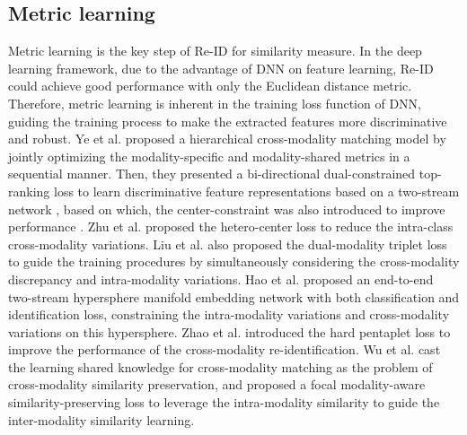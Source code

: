 \documentclass[journal]{IEEEtran}
\begin{document}
\subsection{Metric learning}
Metric learning is the key step of Re-ID for similarity measure. In the deep learning framework, due to the advantage of DNN on feature learning, Re-ID could achieve good performance with only the Euclidean distance metric. Therefore, metric learning is inherent in the training loss function of DNN, guiding the training process to make the extracted features more discriminative and robust.
Ye et al. \cite{ye2018hierarchical} proposed a hierarchical cross-modality matching model by jointly optimizing the modality-specific and modality-shared metrics in a sequential manner. Then, they presented a bi-directional dual-constrained top-ranking loss to learn discriminative feature representations based on a two-stream network \cite{ye2018visible}, based on which, the center-constraint was also introduced to improve performance \cite{tifs19vtreid}.
Zhu et al. \cite{zhu2019hetero} proposed the hetero-center loss to reduce the intra-class cross-modality variations.
Liu et al. \cite{liu2020enhancing} also proposed the dual-modality triplet loss to guide the training procedures by simultaneously considering the cross-modality discrepancy and intra-modality variations.
Hao et al. \cite{hao2019hsme} proposed an end-to-end two-stream hypersphere manifold embedding network with both classification and identification loss, constraining the intra-modality variations and cross-modality variations on this hypersphere.
Zhao et al. \cite{zhao2019hpiln} introduced the hard pentaplet loss to improve the performance of the cross-modality re-identification.
Wu et al. \cite{wu2020rgb} cast the learning shared knowledge for cross-modality matching as the problem of cross-modality similarity preservation, and proposed a focal modality-aware similarity-preserving loss to leverage the intra-modality similarity to guide the inter-modality similarity learning.
\end{document}
